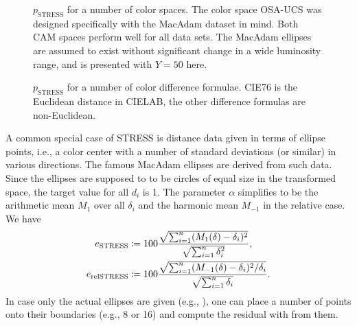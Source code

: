 \documentclass{scrartcl}
\theoremstyle{named}
\begin{document}
\begin{figure}
\centering

\caption{$p_\text{STRESS}$ for a number of color spaces. The color space OSA-UCS was
designed specifically with the MacAdam \cite{macadam1974} dataset in mind. Both CAM
spaces perform well for all data sets. The MacAdam ellipses are assumed to exist without
  significant change in a wide luminosity range, and is presented with $Y=50$ here.}
\end{figure}

\begin{figure}
\centering
  
  \caption{$p_\text{STRESS}$ for a number of color difference formulae.  CIE76 is the
  Euclidean distance in CIELAB, the other difference formulas are non-Euclidean.}
\end{figure}

A common special case of STRESS is distance data given in terms of ellipse points,
i.e., a color center with a number of standard deviations (or similar) in various
directions. The famous MacAdam ellipses \cite{macadam1942} are derived from such data.
Since the ellipses are supposed to to be circles of equal size in the transformed space,
the target value for all $d_i$ is 1. The parameter $\alpha$ simplifies to be the
arithmetic mean $M_1$ over all $\delta_i$ and the harmonic mean $M_{-1}$ in the
relative case. We have
\begin{align}\label{eq:e}
  e_{\text{STRESS}}
  &\coloneqq
  100
  \frac{%
    \sqrt{\sum_{i=1}^n (M_1(\delta) - \delta_{i})^2}
  }{
    \sqrt{\sum_{i=1}^n \delta_i^2}
  },
  \\
  \nonumber
  e_{\text{relSTRESS}}
  &\coloneqq
  100
  \frac{%
    \sqrt{\sum_{i=1}^n (M_{-1}(\delta) - \delta_{i})^2 / \delta_i}
  }{
    \sqrt{\sum_{i=1}^n \delta_i}
  }.
\end{align}
In case only the actual ellipses are given (e.g., \cite{luorigg}), one can place a
number of points onto their boundaries (e.g., 8 or 16) and compute the residual with
from them.
\end{document}
